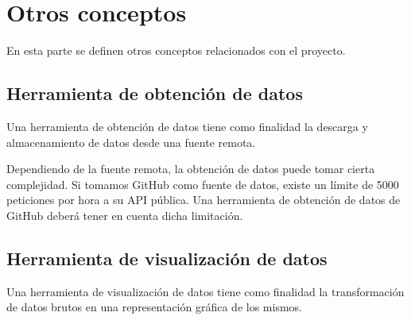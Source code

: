 \section{Otros conceptos}

En esta parte se definen otros conceptos relacionados con el proyecto.

\subsection{Herramienta de obtención de datos}

Una herramienta de obtención de datos tiene como finalidad la descarga y almacenamiento de datos desde una fuente remota.

Dependiendo de la fuente remota, la obtención de datos puede tomar cierta complejidad. Si tomamos GitHub como fuente de datos, existe un límite de 5000 peticiones por hora a su API pública. Una herramienta de obtención de datos de GitHub deberá tener en cuenta dicha limitación.

\subsection{Herramienta de visualización de datos}

Una herramienta de visualización de datos tiene como finalidad la transformación de datos brutos en una representación gráfica de los mismos.
